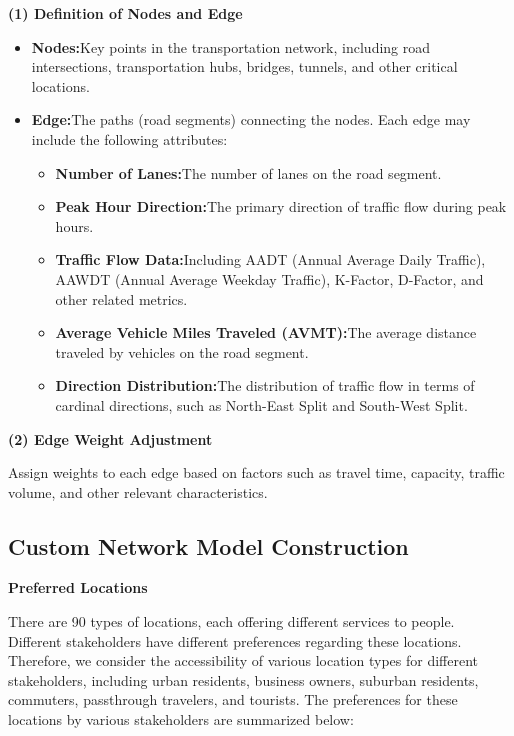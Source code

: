 \documentclass{mcmthesis}
\begin{document}
\textbf{(1) Definition of Nodes and Edge}
\vspace{-5mm}
\begin{itemize}
    \item \textbf{Nodes:}Key points in the transportation network, including road intersections, transportation hubs, bridges, tunnels, and other critical locations.

    \item \textbf{Edge:}The paths (road segments) connecting the nodes. Each edge may include the following attributes:
        \begin{itemize}
            \item \textbf{Number of Lanes:}The number of lanes on the road segment.

            \item \textbf{Peak Hour Direction:}The primary direction of traffic flow during peak hours.

            \item \textbf{Traffic Flow Data:}Including AADT (Annual Average Daily Traffic), AAWDT (Annual Average Weekday Traffic), K-Factor, D-Factor, and other related metrics.

            \item \textbf{Average Vehicle Miles Traveled (AVMT):}The average distance traveled by vehicles on the road segment.

            \item \textbf{Direction Distribution:}The distribution of traffic flow in terms of cardinal directions, such as North-East Split and South-West Split.
        \end{itemize}
\end{itemize}

\vspace{-5mm}
\textbf{(2) Edge Weight Adjustment}

Assign weights to each edge based on factors such as travel time, capacity, traffic volume, and other relevant characteristics.


\subsection{Custom Network Model Construction}

\textbf{Preferred Locations}

There are 90 types of locations, each offering different services to people. Different stakeholders have different preferences regarding these locations. Therefore, we consider the accessibility of various location types for different stakeholders, including urban residents, business owners, suburban residents, commuters, passthrough travelers, and tourists. The preferences for these locations by various stakeholders are summarized below:
\end{document}
